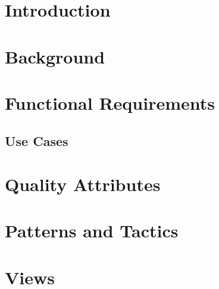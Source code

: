 \documentclass[11pt]{article}
\begin{document}
\tableofcontents			%
\setcounter{tocdepth}{1}		%
\listoffigures				%

\newpage
{}
\setcounter{page}{1}


\section{Introduction}

\section{Background}

\section{Functional Requirements}

\subsection{Use Cases}

\section{Quality Attributes}

\section{Patterns and Tactics}

\section{Views}

\end{document}
